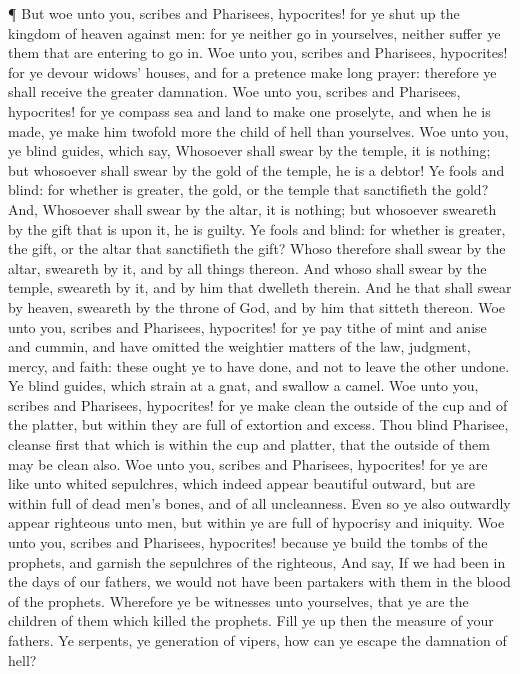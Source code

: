  ¶ But woe unto you, scribes and Pharisees, hypocrites! for
ye shut up the kingdom of heaven against men: for ye neither go in
yourselves, neither suffer ye them that are entering to go in.
 Woe unto you, scribes and Pharisees, hypocrites! for ye
devour widows' houses, and for a pretence make long prayer: therefore ye
shall receive the greater damnation.  Woe unto you, scribes
and Pharisees, hypocrites! for ye compass sea and land to make one
proselyte, and when he is made, ye make him twofold more the child of
hell than yourselves.  Woe unto you, ye blind guides, which
say, Whosoever shall swear by the temple, it is nothing; but whosoever
shall swear by the gold of the temple, he is a debtor!  Ye
fools and blind: for whether is greater, the gold, or the temple that
sanctifieth the gold?  And, Whosoever shall swear by the
altar, it is nothing; but whosoever sweareth by the gift that is upon
it, he is guilty.  Ye fools and blind: for whether is
greater, the gift, or the altar that sanctifieth the gift? 
Whoso therefore shall swear by the altar, sweareth by it, and by all
things thereon.  And whoso shall swear by the temple,
sweareth by it, and by him that dwelleth therein.  And he
that shall swear by heaven, sweareth by the throne of God, and by him
that sitteth thereon.  Woe unto you, scribes and Pharisees,
hypocrites! for ye pay tithe of mint and anise and cummin, and have
omitted the weightier matters of the law, judgment, mercy, and faith:
these ought ye to have done, and not to leave the other undone.
 Ye blind guides, which strain at a gnat, and swallow a
camel.  Woe unto you, scribes and Pharisees, hypocrites!
for ye make clean the outside of the cup and of the platter, but within
they are full of extortion and excess.  Thou blind
Pharisee, cleanse first that which is within the cup and platter, that
the outside of them may be clean also.  Woe unto you,
scribes and Pharisees, hypocrites! for ye are like unto whited
sepulchres, which indeed appear beautiful outward, but are within full
of dead men's bones, and of all uncleanness.  Even so ye
also outwardly appear righteous unto men, but within ye are full of
hypocrisy and iniquity.  Woe unto you, scribes and
Pharisees, hypocrites! because ye build the tombs of the prophets, and
garnish the sepulchres of the righteous,  And say, If we
had been in the days of our fathers, we would not have been partakers
with them in the blood of the prophets.  Wherefore ye be
witnesses unto yourselves, that ye are the children of them which killed
the prophets.  Fill ye up then the measure of your fathers.
 Ye serpents, ye generation of vipers, how can ye escape
the damnation of hell?

